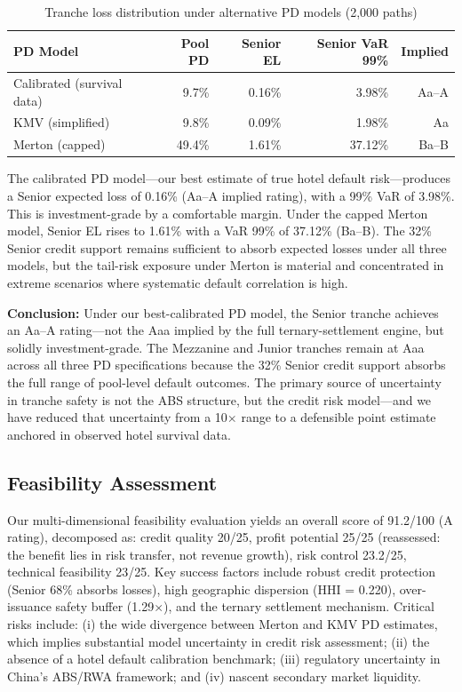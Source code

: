 \documentclass[12pt,a4paper]{article}
\begin{document}
\begin{table}[H]
\centering
\caption{Tranche loss distribution under alternative PD models (2,000 paths)}
\label{tab:pd-mc}
\begin{tabular}{@{}lrrrr@{}}
\toprule
\textbf{PD Model} & \textbf{Pool PD} & \textbf{Senior EL} & \textbf{Senior VaR 99\%} & \textbf{Implied} \\
\midrule
Calibrated (survival data) & 9.7\%  & 0.16\% & 3.98\%   & Aa--A \\
KMV (simplified)           & 9.8\%  & 0.09\% & 1.98\%   & Aa \\
Merton (capped)            & 49.4\% & 1.61\% & 37.12\%  & Ba--B \\
\bottomrule
\end{tabular}
\end{table}

The calibrated PD model---our best estimate of true hotel default risk---produces a Senior expected loss of 0.16\% (Aa--A implied rating), with a 99\% VaR of 3.98\%.
This is investment-grade by a comfortable margin.
Under the capped Merton model, Senior EL rises to 1.61\% with a VaR 99\% of 37.12\% (Ba--B).
The 32\% Senior credit support remains sufficient to absorb expected losses under all three models, but the tail-risk exposure under Merton is material and concentrated in extreme scenarios where systematic default correlation is high.

\textbf{Conclusion:} Under our best-calibrated PD model, the Senior tranche achieves an Aa--A rating---not the Aaa implied by the full ternary-settlement engine, but solidly investment-grade.
The Mezzanine and Junior tranches remain at Aaa across all three PD specifications because the 32\% Senior credit support absorbs the full range of pool-level default outcomes.
The primary source of uncertainty in tranche safety is not the ABS structure, but the credit risk model---and we have reduced that uncertainty from a 10$\times$ range to a defensible point estimate anchored in observed hotel survival data.

\subsection{Feasibility Assessment}

Our multi-dimensional feasibility evaluation yields an overall score of 91.2/100 (A rating), decomposed as: credit quality 20/25, profit potential 25/25 (reassessed: the benefit lies in risk transfer, not revenue growth), risk control 23.2/25, technical feasibility 23/25.
Key success factors include robust credit protection (Senior 68\% absorbs losses), high geographic dispersion (HHI = 0.220), over-issuance safety buffer (1.29$\times$), and the ternary settlement mechanism.
Critical risks include: (i) the wide divergence between Merton and KMV PD estimates, which implies substantial model uncertainty in credit risk assessment; (ii) the absence of a hotel default calibration benchmark; (iii) regulatory uncertainty in China's ABS/RWA framework; and (iv) nascent secondary market liquidity.
\end{document}
